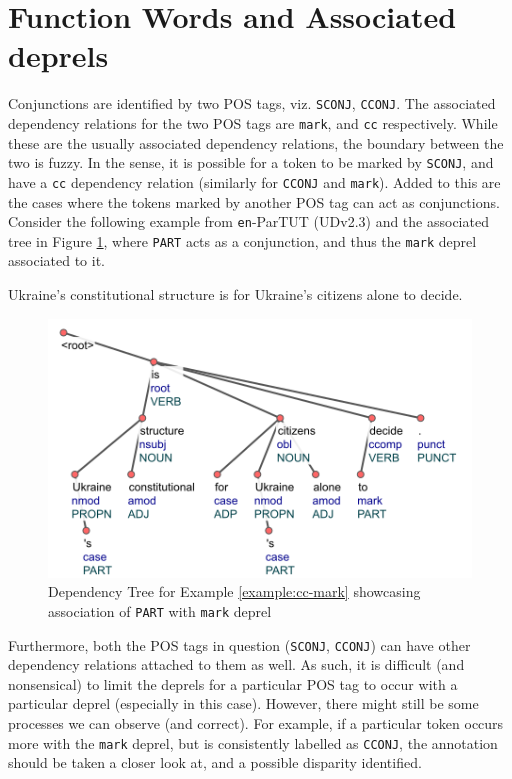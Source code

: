 \section{Function Words and Associated deprels}
\label{sssec:conj_deprels_association}

Conjunctions are identified by two POS tags, viz. \verb|SCONJ|, \verb|CCONJ|. The associated dependency relations for the two POS tags are \verb|mark|, and \verb|cc| respectively. While these are the usually associated dependency relations, the boundary between the two is fuzzy. In the sense, it is possible for a token to be marked by \verb|SCONJ|, and have a \verb|cc| dependency relation (similarly for \verb|CCONJ| and \verb|mark|). Added to this are the cases where the tokens marked by another POS tag can act as conjunctions. Consider the following example from \verb|en|-ParTUT (UDv2.3) and the associated tree in Figure \ref{fig:func_multi}, where \verb|PART| acts as a conjunction, and thus the \verb|mark| deprel associated to it.

\begin{example}
\label{example:cc-mark}
Ukraine's constitutional structure is for Ukraine's citizens alone to decide.
\end{example}

\begin{figure}[ht]
    \centering
    \includegraphics{img/cc-mark.png}
    \caption[Dependency Tree showcasing association of \texttt{PART} with \texttt{mark} deprel]{Dependency Tree for Example \ref{example:cc-mark} showcasing association of \texttt{PART} with \texttt{mark} deprel}
    \label{fig:func_multi}
\end{figure}

Furthermore, both the POS tags in question (\verb|SCONJ|, \verb|CCONJ|) can have other dependency relations attached to them as well. As such, it is difficult (and nonsensical) to limit the deprels for a particular POS tag to occur with a particular deprel (especially in this case). However, there might still be some processes we can observe (and correct). For example, if a particular token occurs more with the \verb|mark| deprel, but is consistently labelled as \verb|CCONJ|, the annotation should be taken a closer look at, and a possible disparity identified.

